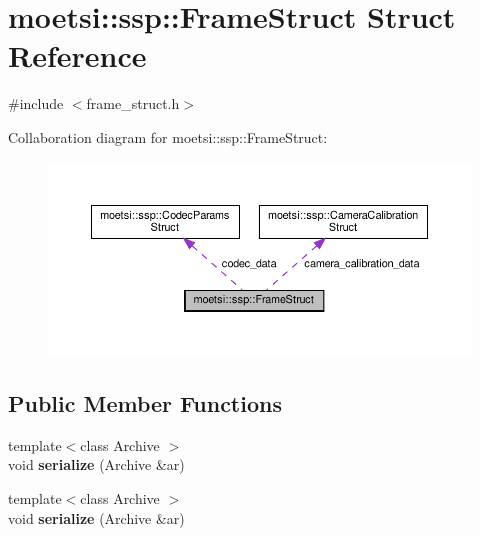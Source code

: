 \hypertarget{structmoetsi_1_1ssp_1_1FrameStruct}{}\section{moetsi\+:\+:ssp\+:\+:Frame\+Struct Struct Reference}
\label{structmoetsi_1_1ssp_1_1FrameStruct}


{\ttfamily \#include $<$frame\+\_\+struct.\+h$>$}



Collaboration diagram for moetsi\+:\+:ssp\+:\+:Frame\+Struct\+:\nopagebreak
\begin{figure}[H]
\begin{center}
\leavevmode
\includegraphics[width=350pt]{structmoetsi_1_1ssp_1_1FrameStruct__coll__graph}
\end{center}
\end{figure}
\subsection*{Public Member Functions}
\begin{DoxyCompactItemize}
\item 
\mbox{\label{structmoetsi_1_1ssp_1_1FrameStruct_af53f4e76978e2a4575b7cd661d30e01f}} 
{\footnotesize template$<$class Archive $>$ }\\void {\bfseries serialize} (Archive \&ar)
\item 
\mbox{\label{structmoetsi_1_1ssp_1_1FrameStruct_af53f4e76978e2a4575b7cd661d30e01f}} 
{\footnotesize template$<$class Archive $>$ }\\void {\bfseries serialize} (Archive \&ar)
\end{DoxyCompactItemize}
